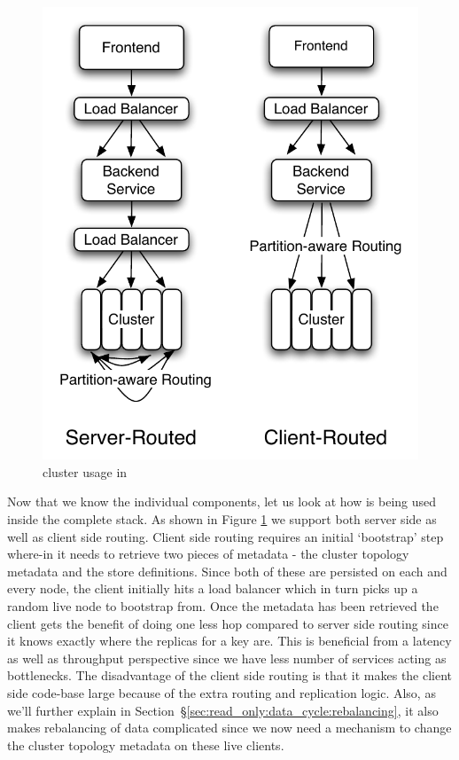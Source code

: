 \begin{figure}
  \centering
    \includegraphics[scale=0.45]{images/fullstack.pdf}
  \caption{\projectname{} cluster usage in \linkedin{}}
  \label{fullstack}
\end{figure}


\noindent 
Now that we know the individual components, let us look at how \projectname{} is being used inside the complete \linkedin{} stack. As shown in Figure \ref{fullstack} we support both server side as well as client side routing. Client side routing requires an initial `bootstrap' step where-in it needs to retrieve two pieces of metadata - the cluster topology metadata and the store definitions. Since both of these are persisted on each and every \projectname{} node, the client initially hits a load balancer which in turn picks up a random live node to bootstrap from. Once the metadata has been retrieved the client gets the benefit of doing one less hop compared to server side routing since it knows exactly where the replicas for a key are. This is beneficial from a latency as well as throughput perspective since we have less number of services acting as bottlenecks. The disadvantage of the client side routing is that it makes the client side code-base large because of the extra routing and replication logic. Also, as we'll further explain in Section~\S\ref{sec:read_only:data_cycle:rebalancing}, it also makes rebalancing of data complicated since we now need a mechanism to change the cluster topology metadata on these live clients. 


